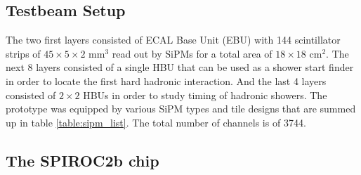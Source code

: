 \documentclass[twoside,a4paper,11pt]{article}
\begin{document}
\subsection{Testbeam Setup}

The two first layers consisted of ECAL Base Unit (EBU) with 144 scintillator strips of $45\times5\times2$ mm$^3$ read out by SiPMs for a total area of $18\times18$ cm$^2$. The next 8 layers consisted of a single HBU that can be used as a shower start finder in order to locate the first hard hadronic interaction. And the last 4 layers consisted of $2\times2$ HBUs in order to study timing of hadronic showers. The prototype was equipped by various SiPM types and tile designs that are summed up in table \ref{table:sipm_list}. The total number of channels is of 3744.
\begin{table}[h!]
\centering
{}
\caption{List of the different SiPMs used in the CALICE AHCAL in July 2015.}
\label{table:sipm_list}
\end{table}

\subsection{The SPIROC2b chip}
\end{document}

